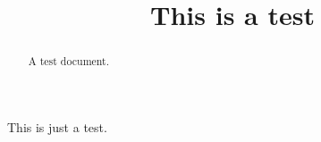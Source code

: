 \documentclass{ximera}
\title{This is a test}
\begin{document}
\begin{abstract}
  A test document.
\end{abstract}
\maketitle
This is just a test.
\end{document}
